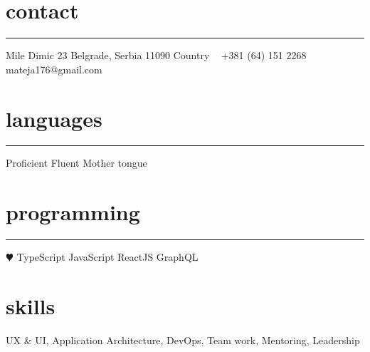 \documentclass[]{cv-style}          %
\begin{document}


\begin{aside}
  \section{contact}
  \color{gray} \rule{\textwidth}{0.1mm}
  Mile Dimic 23
  Belgrade, Serbia 11090
  Country
  ~
  +381 (64) 151 2268
  ~
  mateja176@gmail.com
  \section{languages}
  \rule{\textwidth}{0.1mm}
  \space\space\space\space\space\space\space\space\space\space\space\space Proficient
  \space\space\space\space\space\space\space\space\space\space\space\space\space\space\space\space\space\space Fluent
  \space\space Mother tongue
  \section{programming}
  \rule{\textwidth}{0.1mm}
  {\color{blue} $\varheartsuit$} TypeScript
  JavaScript
  ReactJS
  GraphQL
\end{aside}


\section{skills}
\vspace{-0.2cm}

UX \& UI, Application Architecture, DevOps, Team work, Mentoring, Leadership
\end{document}
